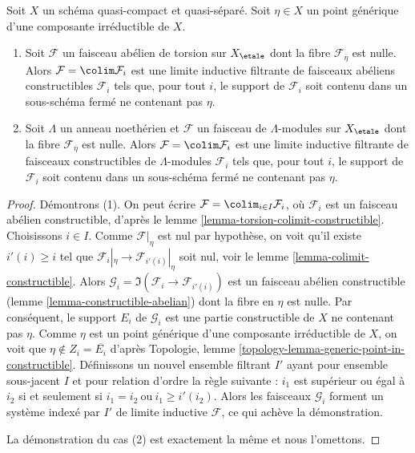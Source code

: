 \begin{lemma}
\label{lemma-zero-in-generic-point}
Soit $X$ un schéma quasi-compact et quasi-séparé. Soit
$\eta \in X$ un point générique d'une composante irréductible de $X$.
\begin{enumerate}
\item Soit $\mathcal{F}$ un faisceau abélien de torsion sur $X_\etale$
dont la fibre $\mathcal{F}_{\overline{\eta}}$ est nulle.
Alors $\mathcal{F} = \colim \mathcal{F}_i$ est une limite inductive filtrante de
faisceaux abéliens constructibles $\mathcal{F}_i$ tels que, pour tout $i$,
le support de $\mathcal{F}_i$ soit contenu
dans un sous-schéma fermé ne contenant pas $\eta$.
\item Soit $\Lambda$ un anneau noethérien et $\mathcal{F}$ un faisceau
de $\Lambda$-modules sur $X_\etale$ dont la fibre
$\mathcal{F}_{\overline{\eta}}$ est nulle. Alors
$\mathcal{F} = \colim \mathcal{F}_i$
est une limite inductive filtrante de faisceaux constructibles de
$\Lambda$-modules $\mathcal{F}_i$ tels que, pour tout $i$,
le support de $\mathcal{F}_i$ soit contenu dans un sous-schéma fermé
ne contenant pas $\eta$.
\end{enumerate}
\end{lemma}

\begin{proof}
Démontrons (1). On peut écrire $\mathcal{F} = \colim_{i \in I} \mathcal{F}_i$,
où $\mathcal{F}_i$ est un faisceau abélien constructible, d'après le
lemme \ref{lemma-torsion-colimit-constructible}.
Choisissons $i \in I$. Comme $\mathcal{F}|_\eta$ est nul par hypothèse, on
voit qu'il existe $i'(i) \geq i$ tel que
$\mathcal{F}_i|_\eta \to \mathcal{F}_{i'(i)}|_\eta$ soit nul, voir le
lemme \ref{lemma-colimit-constructible}.
Alors $\mathcal{G}_i = \Im(\mathcal{F}_i \to \mathcal{F}_{i'(i)})$
est un faisceau abélien constructible (lemme \ref{lemma-constructible-abelian})
dont la fibre en $\eta$ est nulle.
Par conséquent, le support $E_i$ de $\mathcal{G}_i$ est une partie constructible
de $X$ ne contenant pas $\eta$. Comme
$\eta$ est un point générique d'une composante irréductible de
$X$, on voit que $\eta \not \in Z_i = \overline{E_i}$ d'après
Topologie, lemme \ref{topology-lemma-generic-point-in-constructible}.
Définissons un nouvel ensemble filtrant $I'$ ayant pour ensemble sous-jacent $I$ et
pour relation d'ordre la règle suivante :
$i_1$ est supérieur ou égal à $i_2$ si et seulement si $i_1 = i_2\ \text{ou}\ i_1 \geq i'(i_2)$.
Alors les faisceaux $\mathcal{G}_i$ forment un système indexé par $I'$
de limite inductive $\mathcal{F}$, ce qui achève la démonstration.

\medskip\noindent
La démonstration du cas (2) est exactement la même et nous l'omettons.
\end{proof}








